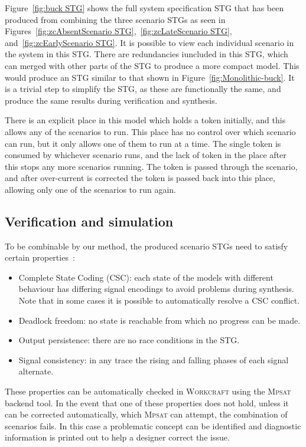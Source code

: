\documentclass[british,compsoc]{IEEEtran}
\newcommand{\noun}[1]{\textsc{#1}}
\begin{document}
Figure~\ref{fig:buck STG} shows the full system specification STG
that has been produced from combining the three scenario STGs as seen
in Figures~\ref{fig:zcAbsentScenario STG},~\ref{fig:zcLateScenario STG},
and~\ref{fig:zcEarlyScenario STG}. It is possible to view each individual
scenario in the system in this STG. There are redundancies iuncluded in
this STG, which can merged with other parts of the STG
to produce a more compact model. This would produce an STG
similar to that shown in Figure~\ref{fig:Monolithic-buck}.  It is a trivial
step to simplify the STG, as these are functionally the same, and
produce the same results during verification and synthesis.

There is an explicit place in this model which holds a token initially,
and this allows any of the scenarios to run. This place has no
control over which scenario can run, but it only allows one of
them to run at a time. The single token is consumed
by whichever scenario runs, and the lack of token in the place
after this stops any more scenarios running. The token is passed through
the scenario, and after over-current is corrected the token is passed
back into this place, allowing only one of the scenarios to run again.


\subsection{Verification and simulation}


To be combinable by our method, the produced scenario STGs need to satisfy certain
properties~\cite{Cortadella}:
\begin{itemize}
\item Complete State Coding (CSC): each state of the models with different
behaviour has differing signal encodings to avoid problems during
synthesis. Note that in some cases it is possible to automatically
resolve a CSC conflict.
\item Deadlock freedom: no state is reachable from which no progress can
be made.
\item Output persistence: there are no race conditions in the STG.
\item Signal consistency: in any trace the rising and falling phases of
each signal alternate.
\end{itemize}
These properties can be automatically checked in \noun{Workcraft }using
the \noun{Mpsat}~\cite{khomenko2004detecting} backend tool\noun{.
}In the event that one of these properties does not hold, unless it
can be corrected automatically, which \noun{Mpsat} can attempt, the combination of scenarios fails.
In this case a problematic concept can be identified and diagnostic information
is printed out to help a designer correct the issue.
\end{document}
